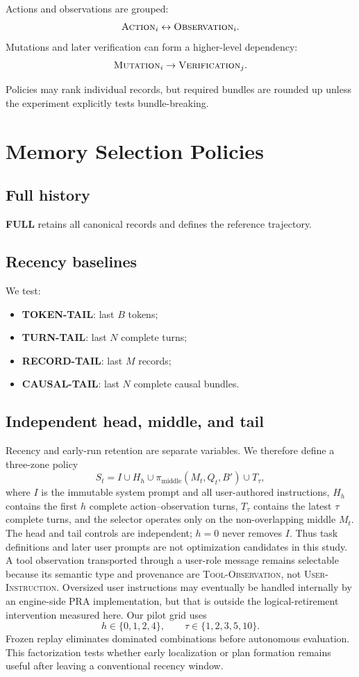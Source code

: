\documentclass[11pt]{article}
\begin{document}
Actions and observations are grouped:
\[
\textsc{Action}_i \leftrightarrow \textsc{Observation}_i.
\]
Mutations and later verification can form a higher-level dependency:
\[
\textsc{Mutation}_i \rightarrow \textsc{Verification}_j.
\]

Policies may rank individual records, but required bundles are rounded up unless
the experiment explicitly tests bundle-breaking.

\section{Memory Selection Policies}

\subsection{Full history}

\textbf{FULL} retains all canonical records and defines the reference trajectory.

\subsection{Recency baselines}

We test:
\begin{itemize}[leftmargin=*]
    \item \textbf{TOKEN-TAIL}: last $B$ tokens;
    \item \textbf{TURN-TAIL}: last $N$ complete turns;
    \item \textbf{RECORD-TAIL}: last $M$ records;
    \item \textbf{CAUSAL-TAIL}: last $N$ complete causal bundles.
\end{itemize}

\subsection{Independent head, middle, and tail}

Recency and early-run retention are separate variables. We therefore define a
three-zone policy
\[
S_t = I \cup H_h \cup \pi_{\mathrm{middle}}(M_t,Q_t,B') \cup T_\tau,
\]
where $I$ is the immutable system prompt and all user-authored instructions,
$H_h$ contains the
first $h$ complete action--observation turns, $T_\tau$ contains the latest
$\tau$ complete turns, and the selector operates only on the non-overlapping
middle $M_t$. The head and tail controls are independent; $h=0$ never removes
$I$.  Thus task definitions and later user prompts are not optimization
candidates in this study.  A tool observation transported through a
user-role message remains selectable because its semantic type and provenance
are \textsc{Tool-Observation}, not \textsc{User-Instruction}.  Oversized user
instructions may eventually be handled internally by an engine-side PRA
implementation, but that is outside the logical-retirement intervention
measured here. Our pilot grid uses
\[
h\in\{0,1,2,4\},\qquad \tau\in\{1,2,3,5,10\}.
\]
Frozen replay eliminates dominated combinations before autonomous evaluation.
This factorization tests whether early localization or plan formation remains
useful after leaving a conventional recency window.
\end{document}
